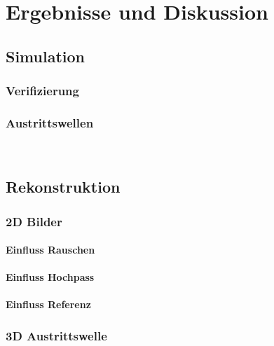 \chapter{Ergebnisse und Diskussion}
\section{Simulation}
\subsection{Verifizierung}
\subsection{Austrittswellen}
\
\section{Rekonstruktion}
\subsection{2D Bilder}
\subsubsection{Einfluss Rauschen}
\subsubsection{Einfluss Hochpass}
\subsubsection{Einfluss Referenz}
\subsection{3D Austrittswelle}